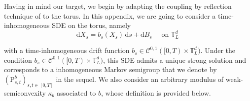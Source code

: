 \documentclass[final,12pt]{colt2023} %
\newcommand{\De}{\mathrm{d}}
\newcommand{\rmP}{\mathrm{P}}
\begin{document}
\bigskip

Having in mind our target, we begin by adapting the coupling by reflection technique of \cite{wang1994neumann,eberle2016reflection} to the torus. In this appendix, we are going to consider a time-inhomogeneous SDE on the torus, namely
\begin{equation}
  \label{eq:inhom_diffusion}
\De X_s=b_s(X_s)\,\De s+\De B_s\quad \text{ on }\mathbb{T}_L^d\,
\end{equation}

with a time-inhomogeneous drift function $b_s\in \mathcal{C}^{0,1}([0,T)\times\mathbb{T}^d_L)$.
Under the condition $b_s\in \mathcal{C}^{0,1}([0,T)\times\mathbb{T}^d_L)$, this SDE admits a unique strong solution and corresponds to a inhomogeneous Markov semigroup that we denote by $(\rmP_{s,t}^b)_{s,t \in [0,T]}$ in the sequel. 
We also consider an arbitrary modulus of weak-semiconvexity $\kappa_b$ associated to $b$, whose definition is provided below. 
\end{document}
